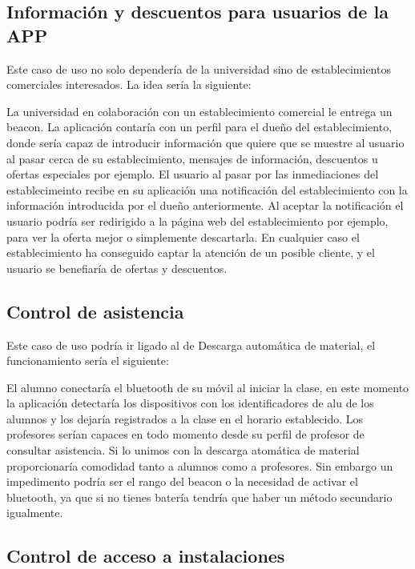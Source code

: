 \subsection{Información y descuentos para usuarios de la APP}

Este caso de uso no solo dependería de la universidad sino de establecimientos comerciales interesados. La idea sería la siguiente: 

La universidad en colaboración con un establecimiento comercial le entrega un beacon. La aplicación contaría con un perfil para el dueño del establecimiento, donde sería capaz de introducir información que quiere que se muestre al usuario al pasar cerca de su establecimiento, mensajes de información, descuentos u ofertas especiales por ejemplo. El usuario al pasar por las inmediaciones del establecimeinto recibe en su aplicación una notificación del establecimiento con la información introducida por el dueño anteriormente. Al aceptar la notificación el usuario podría ser redirigido a la página web del establecimiento por ejemplo, para ver la oferta mejor o simplemente descartarla. En cualquier caso el establecimiento ha conseguido captar la atención de un posible cliente, y el usuario se benefiaría de ofertas y descuentos. 

\subsection{Control de asistencia}

Este caso de uso podría ir ligado al de Descarga automática de material, el funcionamiento sería el siguiente: 

El alumno conectaría el bluetooth de su móvil al iniciar la clase, en este momento la aplicación detectaría los dispositivos con los identificadores de alu de los alumnos y los dejaría registrados a la clase en el horario establecido. Los profesores serían capaces en todo momento desde su perfil de profesor de consultar asistencia. Si lo unimos con la descarga atomática de material proporcionaría comodidad tanto a alumnos como a profesores. Sin embargo un impedimento podría ser el rango del beacon o la necesidad de activar el bluetooth, ya que si  no tienes batería tendría que haber  un método secundario igualmente. 

\subsection{Control de acceso a instalaciones}


